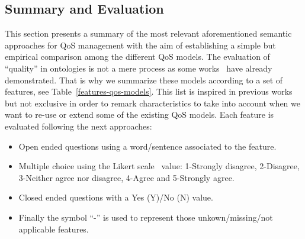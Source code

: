\subsection{Summary and Evaluation}
This section presents a summary of the most relevant aforementioned semantic approaches for QoS management 
with the aim of establishing a simple but empirical comparison among the different QoS models. 
The evaluation of ``quality'' in ontologies is not a mere process as some works~\cite{DBLP:conf/dexa/dAquinSSS07,DBLP:conf/nldb/SabouFM09,Brank05asurvey} have already demonstrated. 
That is why we summarize these models according to a set of features, see Table~\ref{features-qos-models}. 
This list is inspired in previous works but not exclusive in order to remark characteristics 
to take into account when we want to re-use or extend some of the existing QoS models. 
Each feature is evaluated following the next approaches:
\begin{itemize}
 \item Open ended questions using a word/sentence associated to the feature.
 \item Multiple choice using the Likert scale~\cite{albaum1997likert} value: 1-Strongly disagree, 2-Disagree, 3-Neither agree nor disagree, 4-Agree and 5-Strongly agree.
 \item Closed ended questions with a Yes (Y)/No (N) value. 
 \item Finally the symbol ``-'' is used to represent those unkown/missing/not applicable features.
\end{itemize}

